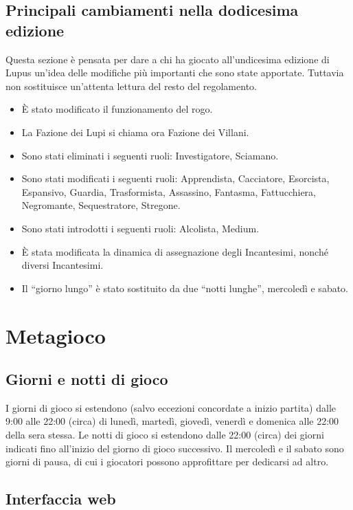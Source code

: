 \documentclass[a4paper,10pt]{article}
\begin{document}
\subsection{Principali cambiamenti nella dodicesima edizione}

Questa sezione è pensata per dare a chi ha giocato all'undicesima edizione di Lupus un'idea delle modifiche più importanti che sono state apportate. Tuttavia non sostituisce un'attenta lettura del resto del regolamento.

\begin{itemize}
      \item È stato modificato il funzionamento del rogo.
      \item La Fazione dei Lupi si chiama ora Fazione dei Villani.
      \item Sono stati eliminati i seguenti ruoli: Investigatore, Sciamano.
      \item Sono stati modificati i seguenti ruoli: Apprendista, Cacciatore, Esorcista, Espansivo, Guardia, Trasformista, Assassino, Fantasma, Fattucchiera, Negromante, Sequestratore, Stregone.
      \item Sono stati introdotti i seguenti ruoli: Alcolista, Medium.
      \item È stata modificata la dinamica di assegnazione degli Incantesimi, nonché diversi Incantesimi.
      \item Il ``giorno lungo'' è stato sostituito da due ``notti lunghe'', mercoledì e sabato.
\end{itemize}

\pagebreak

\section{Metagioco}

\subsection{Giorni e notti di gioco}

I giorni di gioco si estendono (salvo eccezioni concordate a inizio partita) dalle 9:00 alle 22:00 (circa) di lunedì, martedì, giovedì, venerdì e domenica alle 22:00 della sera stessa. Le notti di gioco si estendono dalle 22:00 (circa) dei giorni indicati fino all'inizio del giorno di gioco successivo. Il mercoledì e il sabato sono giorni di pausa, di cui i giocatori possono approfittare per dedicarsi ad altro.

\subsection{Interfaccia web}
\end{document}
